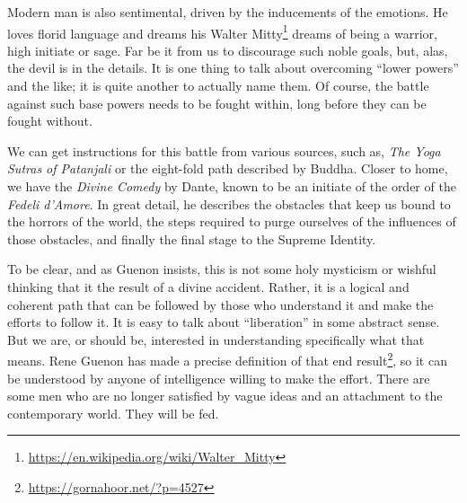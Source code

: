 Modern man is also sentimental, driven by the inducements of the emotions. He loves florid language and dreams his Walter Mitty\footnote{\url{https://en.wikipedia.org/wiki/Walter\_Mitty}} dreams of being a warrior, high initiate or sage. Far be it from us to discourage such noble goals, but, alas, the devil is in the details. It is one thing to talk about overcoming ``lower powers'' and the like; it is quite another to actually name them. Of course, the battle against such base powers needs to be fought within, long before they can be fought without.

We can get instructions for this battle from various sources, such as, \emph{The Yoga Sutras of Patanjali} or the eight-fold path described by Buddha. Closer to home, we have the \emph{Divine Comedy} by Dante, known to be an initiate of the order of the \emph{Fedeli d'Amore}. In great detail, he describes the obstacles that keep us bound to the horrors of the world, the steps required to purge ourselves of the influences of those obstacles, and finally the final stage to the Supreme Identity.

To be clear, and as Guenon insists, this is not some holy mysticism or wishful thinking that it the result of a divine accident. Rather, it is a logical and coherent path that can be followed by those who understand it and make the efforts to follow it. It is easy to talk about ``liberation'' in some abstract sense. But we are, or should be, interested in understanding specifically what that means. Rene Guenon has made a precise definition of that end result\footnote{\url{https://gornahoor.net/?p=4527}}, so it can be understood by anyone of intelligence willing to make the effort. There are some men who are no longer satisfied by vague ideas and an attachment to the contemporary world. They will be fed.



